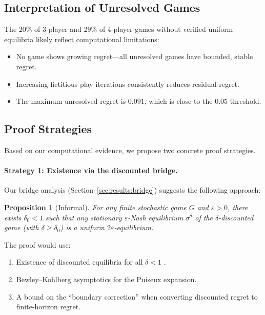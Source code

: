 \documentclass[11pt,a4paper]{article}
\newtheorem{proposition}[theorem]{Proposition}
\theoremstyle{definition}
\newcommand{\eps}{\varepsilon}
\begin{document}
\subsection{Interpretation of Unresolved Games}

The 20\% of 3-player and 29\% of 4-player games without verified uniform equilibria likely reflect computational limitations:
\begin{itemize}[leftmargin=1.5em]
    \item No game shows growing regret---all unresolved games have bounded, stable regret.
    \item Increasing fictitious play iterations consistently reduces residual regret.
    \item The maximum unresolved regret is $0.091$, which is close to the $0.05$ threshold.
\end{itemize}

\subsection{Proof Strategies}\label{sec:discussion:proof}

Based on our computational evidence, we propose two concrete proof strategies.

\paragraph{Strategy 1: Existence via the discounted bridge.}
Our bridge analysis (Section~\ref{sec:results:bridge}) suggests the following approach:

\begin{proposition}[Informal]
For any finite stochastic game $G$ and $\eps > 0$, there exists $\delta_0 < 1$ such that any stationary $\eps$-Nash equilibrium $\sigma^\delta$ of the $\delta$-discounted game (with $\delta \geq \delta_0$) is a uniform $2\eps$-equilibrium.
\end{proposition}

The proof would use:
\begin{enumerate}[leftmargin=1.5em]
    \item Existence of discounted equilibria for all $\delta < 1$ \citep{fink1964equilibrium}.
    \item Bewley--Kohlberg asymptotics \citep{bewley1976stochastic} for the Puiseux expansion.
    \item A bound on the ``boundary correction'' when converting discounted regret to finite-horizon regret.
\end{enumerate}
\end{document}
